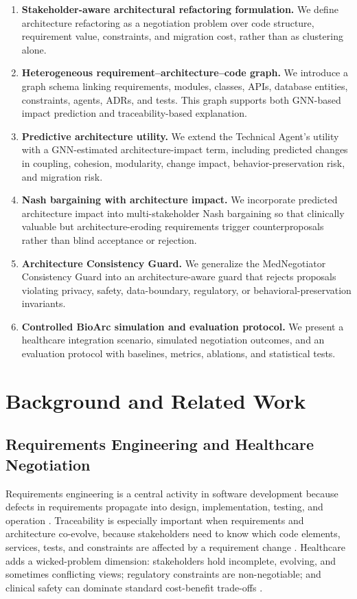 \documentclass[english,preprint,nonatbib]{elsarticle}
\begin{document}
\begin{enumerate}[label=C\arabic*:,leftmargin=2.2em]
  \item \textbf{Stakeholder-aware architectural refactoring formulation.} We define architecture refactoring as a negotiation problem over code structure, requirement value, constraints, and migration cost, rather than as clustering alone.
  \item \textbf{Heterogeneous requirement--architecture--code graph.} We introduce a graph schema linking requirements, modules, classes, APIs, database entities, constraints, agents, ADRs, and tests.
This graph supports both GNN-based impact prediction and traceability-based explanation.
  \item \textbf{Predictive architecture utility.} We extend the Technical Agent's utility with a GNN-estimated architecture-impact term, including predicted changes in coupling, cohesion, modularity, change impact, behavior-preservation risk, and migration risk.
  \item \textbf{Nash bargaining with architecture impact.} We incorporate predicted architecture impact into multi-stakeholder Nash bargaining so that clinically valuable but architecture-eroding requirements trigger counterproposals rather than blind acceptance or rejection.
  \item \textbf{Architecture Consistency Guard.} We generalize the MedNegotiator Consistency Guard into an architecture-aware guard that rejects proposals violating privacy, safety, data-boundary, regulatory, or behavioral-preservation invariants.
  \item \textbf{Controlled BioArc simulation and evaluation protocol.} We present a healthcare integration scenario, simulated negotiation outcomes, and an evaluation protocol with baselines, metrics, ablations, and statistical tests.
\end{enumerate}

\section{Background and Related Work}
\label{sec:background}

\subsection{Requirements Engineering and Healthcare Negotiation}

Requirements engineering is a central activity in software development because defects in requirements propagate into design, implementation, testing, and operation \cite{sommerville2005re,cheng2007future}.
Traceability is especially important when requirements and architecture co-evolve, because stakeholders need to know which code elements, services, tests, and constraints are affected by a requirement change \cite{gotel1994traceability}.
Healthcare adds a wicked-problem dimension: stakeholders hold incomplete, evolving, and sometimes conflicting views; regulatory constraints are non-negotiable;
and clinical safety can dominate standard cost-benefit trade-offs \cite{rittel1973wicked}.
\end{document}
